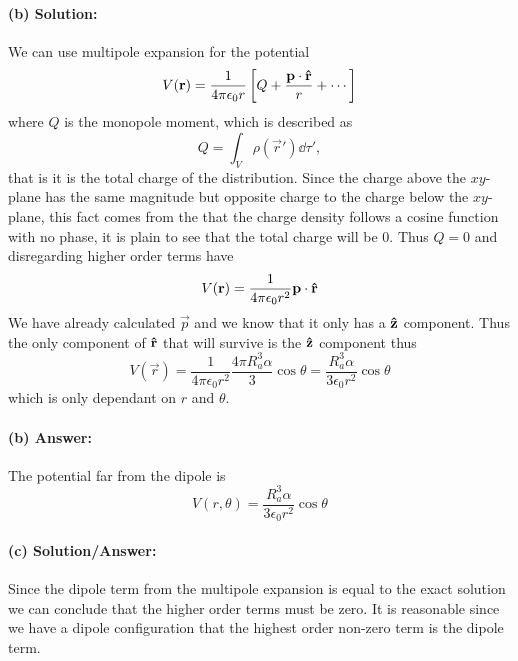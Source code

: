 \paragraph{(b) Solution:} We can use multipole expansion for the potential
\begin{equation}
    V(\mathbf{r}) = \frac{1}{4 \pi \epsilon_0 r}\left[ Q + \frac{\mathbf{p}\cdot\mathbf{\hat{r}}}{r} + \cdots \right]
\end{equation}
where $Q$ is the monopole moment, which is described as
\begin{equation}
    Q = \int_{V} \rho(\vec{r}')\dd \tau',
\end{equation}
that is it is the total charge of the distribution. Since the charge above the $xy$-plane has the same magnitude but opposite charge to the charge below the $xy$-plane, this fact comes from the that the charge density follows a cosine function with no phase, it is plain to see that the total charge will be 0. Thus $Q = 0$ and disregarding higher order terms have
\begin{equation}
    V(\mathbf{r}) = \frac{1}{4 \pi \epsilon_0 r^2} \mathbf{p}\cdot\mathbf{\hat{r}}
\end{equation}
We have already calculated $\vec{p}$ and we know that it only has a $\mathbf{\hat{z}}$ component. Thus the only component of $\mathbf{\hat{r}}$ that will survive is the $\mathbf{\hat{z}}$ component thus
\begin{equation}
    V(\vec{r}) = \frac{1}{4 \pi \epsilon_0 r^2} \frac{4\pi R_a^3 \alpha}{3} \cos\theta = \frac{R_a^3 \alpha}{3 \epsilon_0 r^2} \cos\theta
\end{equation}
which is only dependant on $r$ and $\theta$.
\paragraph{(b) Answer:} The potential far from the dipole is
\begin{equation}
    V(r,\theta) = \frac{R_a^3 \alpha}{3 \epsilon_0 r^2} \cos\theta
\end{equation}

\paragraph{(c) Solution/Answer:} Since the dipole term from the multipole expansion is equal to the exact solution we can conclude that the higher order terms must be zero. It is reasonable since we have a dipole configuration that the highest order non-zero term is the dipole term.